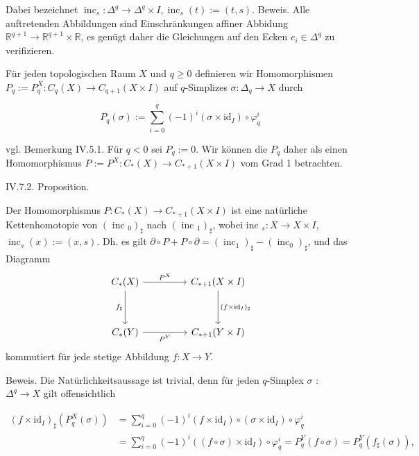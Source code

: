\documentclass[10pt, letterpaper]{article}
\begin{document}
Dabei bezeichnet $\operatorname{inc}_s: \Delta^q \rightarrow \Delta^q \times I, \operatorname{inc}_s(t):=(t, s)$.
Beweis. Alle auftretenden Abbildungen sind Einschränkungen affiner Abbidung $\mathbb{R}^{q+1} \rightarrow \mathbb{R}^{q+1} \times \mathbb{R}$, es genügt daher die Gleichungen auf den Ecken $e_i \in \Delta^q$ zu verifizieren.

Für jeden topologischen Raum $X$ und $q \geq 0$ definieren wir Homomorphismen $P_q:=P_q^X: C_q(X) \rightarrow C_{q+1}(X \times I)$ auf $q$-Simplizes $\sigma: \Delta_q \rightarrow X$ durch

$$
P_q(\sigma):=\sum_{i=0}^q(-1)^i\left(\sigma \times \mathrm{id}_I\right) \circ \varphi_q^i
$$

vgl. Bemerkung IV.5.1. Für $q<0$ sei $P_q:=0$. Wir können die $P_q$ daher als einen Homomorphismus $P:=P^X: C_*(X) \rightarrow C_{*+1}(X \times I)$ vom Grad 1 betrachten.



IV.7.2. Proposition. 

Der Homomorphismus $P: C_*(X) \rightarrow C_{*+1}(X \times I)$ ist eine natürliche Kettenhomotopie von $\left(\text { inc }_0\right)_{\sharp}$ nach $\left(\text { inc }_1\right)_{\sharp}$, wobei inc $_s: X \rightarrow X \times I$, $\operatorname{inc}_s(x):=(x, s)$. Dh. es gilt $\partial \circ P+P \circ \partial=\left(\operatorname{inc}_1\right)_{\sharp}-\left(\operatorname{inc}_0\right)_{\sharp}$, und das Diagramm
\[
\begin{tikzcd}[row sep=3.5em, column sep=4.5em]
C_*(X) \arrow[r, "P^X"] \arrow[d, "f_{\sharp}"'] &
C_{*+1}(X \times I) \arrow[d, "(f \times \mathrm{id}_I)_{\sharp}"] \\
C_*(Y) \arrow[r, "P^Y"'] &
C_{*+1}(Y \times I)
\end{tikzcd}
\]
kommutiert für jede stetige Abbildung $f: X \rightarrow Y$.


Beweis. Die Natürlichkeitsaussage ist trivial, denn für jeden $q$-Simplex $\sigma$ : $\Delta^q \rightarrow X$ gilt offensichtlich

$$
\begin{aligned}
\left(f \times \mathrm{id}_I\right)_{\sharp}\left(P_q^X(\sigma)\right) & =\sum_{i=0}^q(-1)^i\left(f \times \mathrm{id}_I\right) \circ\left(\sigma \times \mathrm{id}_I\right) \circ \varphi_q^i \\
& =\sum_{i=0}^q(-1)^i\left((f \circ \sigma) \times \mathrm{id}_I\right) \circ \varphi_q^i=P_q^Y(f \circ \sigma)=P_q^Y\left(f_{\sharp}(\sigma)\right),
\end{aligned}
$$
\end{document}
